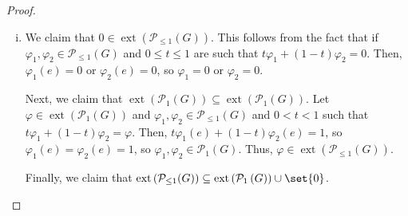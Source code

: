 \documentclass[10pt]{mypackage}
\begin{document}
\begin{proof}\hfill
  \begin{enumerate}[(i)]
    \item We claim that $0\in \operatorname{ext}\left( \mathcal{P}_{\leq 1}(G) \right)$. This follows from the fact that if $\varphi_1,\varphi_2\in \mathcal{P}_{\leq 1}(G)$ and $0\leq t \leq 1$ are such that $t\varphi_1 + \left( 1-t \right)\varphi_2 = 0$. Then, $\varphi_1(e) = 0$ or $\varphi_2(e) = 0$, so $\varphi_1 = 0$ or $\varphi_2 = 0$.

      Next, we claim that $\operatorname{ext}\left( \mathcal{P}_1\left( G \right) \right)\subseteq \operatorname{ext}\left( \mathcal{P}_1\left( G \right) \right)$. Let $\varphi\in \operatorname{ext}\left( \mathcal{P}_1\left( G \right) \right)$ and $\varphi_1,\varphi_2\in \mathcal{P}_{\leq 1}\left( G \right)$ and $0 < t < 1$ such that $t\varphi_1 + \left( 1-t \right)\varphi_2 = \varphi$. Then, $t\varphi_1(e) + \left( 1-t \right)\varphi_2(e) = 1$, so $\varphi_1(e) = \varphi_2(e) = 1$, so $\varphi_1,\varphi_2\in \mathcal{P}_1\left( G \right)$. Thus, $\varphi\in \operatorname{ext}\left( \mathcal{P}_{\leq 1}\left( G \right) \right)$.

      Finally, we claim that $\operatorname{ext}\left( \mathcal{P}_{\leq 1}(G) \right)\subseteq \operatorname{ext}\left( \mathcal{P}_1\left( G \right) \right)\cup\set{0}$.


\end{enumerate}
\end{proof}
\end{document}
